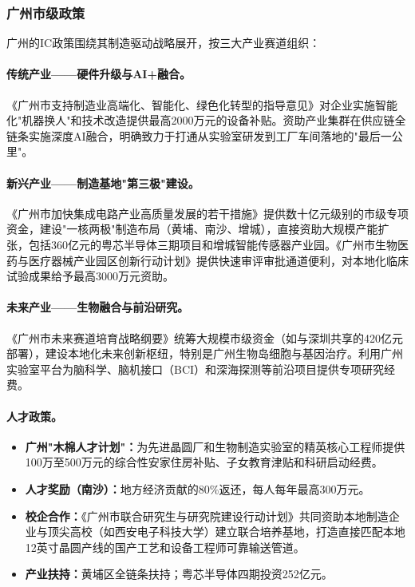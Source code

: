 \documentclass[12pt,a4paper]{article}
\begin{document}
\subsubsection{广州市级政策}

广州的IC政策围绕其制造驱动战略展开，按三大产业赛道组织：

\paragraph{传统产业——硬件升级与AI+融合。}
《广州市支持制造业高端化、智能化、绿色化转型的指导意见》对企业实施智能化"机器换人"和技术改造提供最高2000万元的设备补贴。资助产业集群在供应链全链条实施深度AI融合，明确致力于打通从实验室研发到工厂车间落地的"最后一公里"。

\paragraph{新兴产业——制造基地"第三极"建设。}
《广州市加快集成电路产业高质量发展的若干措施》提供数十亿元级别的市级专项资金，建设"一核两极"制造布局（黄埔、南沙、增城），直接资助大规模产能扩张，包括360亿元的粤芯半导体三期项目和增城智能传感器产业园。《广州市生物医药与医疗器械产业园区创新行动计划》提供快速审评审批通道便利，对本地化临床试验成果给予最高3000万元资助。

\paragraph{未来产业——生物融合与前沿研究。}
《广州市未来赛道培育战略纲要》统筹大规模市级资金（如与深圳共享的420亿元部署），建设本地化未来创新枢纽，特别是广州生物岛细胞与基因治疗。利用广州实验室平台为脑科学、脑机接口（BCI）和深海探测等前沿项目提供专项研究经费。

\paragraph{人才政策。}
\begin{itemize}
    \item \textbf{广州"木棉人才计划"：}为先进晶圆厂和生物制造实验室的精英核心工程师提供100万至500万元的综合性安家住房补贴、子女教育津贴和科研启动经费。
    \item \textbf{人才奖励（南沙）：}地方经济贡献的80\%返还，每人每年最高300万元。
    \item \textbf{校企合作：}《广州市联合研究生与研究院建设行动计划》共同资助本地制造企业与顶尖高校（如西安电子科技大学）建立联合培养基地，打造直接匹配本地12英寸晶圆产线的国产工艺和设备工程师可靠输送管道。
    \item \textbf{产业扶持：}黄埔区全链条扶持；粤芯半导体四期投资252亿元。
\end{itemize}
\end{document}
